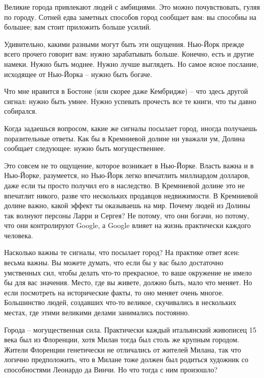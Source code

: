 \documentclass[ebook,12pt,oneside,openany]{memoir}
\begin{document}
\maketitle

Великие города привлекают людей с амбициями. Это можно почувствовать,
гуляя по городу. Сотней едва заметных способов город сообщает вам: вы
способны на большее; вам стоит приложить больше усилий. \newline

Удивительно, какими разными могут быть эти ощущения. Нью-Йорк прежде
всего прочего говорит вам: нужно зарабатывать больше. Конечно, есть и
другие намеки. Нужно быть моднее. Нужно лучше выглядеть. Но самое
ясное послание, исходящее от Нью-Йорка – нужно быть богаче. \newline

Что мне нравится в Бостоне (или скорее даже Кембридже) – что здесь
другой сигнал: нужно быть умнее. Нужно успевать прочесть все те книги,
что ты давно собирался. \newline

Когда задаешься вопросом, какие же сигналы посылает город, иногда
получаешь поразительные ответы. Как бы в Кремниевой долине ни уважали
ум, Долина сообщает следующее: нужно быть могущественнее. \newline

Это совсем не то ощущение, которое возникает в Нью-Йорке. Власть важна
и в Нью-Йорке, разумеется, но Нью-Йорк легко впечатлить миллиардом
долларов, даже если ты просто получил его в наследство. В Кремниевой
долине это не впечатлит никого, разве что нескольких продавцов
недвижимости. В Кремниевой долине важно, какой эффект ты оказываешь на
мир. Почему людей из Долины так волнуют персоны Ларри и Сергея? Не
потому, что они богачи, но потому, что они контролируют Google, а
Google влияет на жизнь практически каждого человека. \newline

Насколько важны те сигналы, что посылает город? На практике ответ
ясен: весьма важны. Вы можете думать, что если бы у вас было
достаточно умственных сил, чтобы делать что-то прекрасное, то ваше
окружение не имело бы для вас значения. Место, где вы живете, должно
быть, мало что меняет. Но если посмотреть на исторические факты, то
оно меняет очень многое. Большинство людей, создавших что-то великое,
скучивались в нескольких местах, где этими великими делами занимались
постоянно. \newline

Города – могущественная сила. Практически каждый итальянский живописец
15 века был из Флоренции, хотя Милан тогда был столь же крупным
городом. Жители Флоренции генетически не отличались от жителей Милана,
так что логично предположить, что в Милане тоже должен был родиться
художник со способностями Леонардо да Винчи. Но что тогда с ним
произошло? \newline
\end{document}
